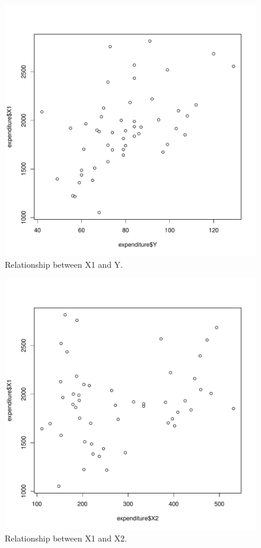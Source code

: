 \documentclass[12pt,letterpaper]{article}
\begin{document}
\begin{itemize}
\begin{figure}[hbtp!]\centering
	\caption{\footnotesize Relationship between X1 and Y.}
	\label{fig:plot_4}
	\includegraphics[width=.75\textwidth]{plot_X1_Y.pdf}
\end{figure}

\begin{figure}[hbtp!]\centering
	\caption{\footnotesize Relationship between X1 and X2.}
	\label{fig:plot_5}
	\includegraphics[width=.75\textwidth]{plot_X1_X2.pdf}
\end{figure}


\end{itemize}
\end{document}
